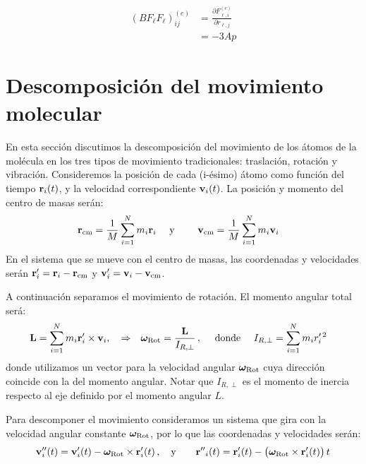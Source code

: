 \begin{align}
  (BF_{\ell}F_{\ell})^{(e)}_{ij} &= \frac{\partial F^{(e)}_{\ell,i}}{\partial r_{\ell,j}} \\&= -3 A p 
\end{align}

\newpage
\section{Descomposici\'{o}n del movimiento molecular}
\label{S:desc-movim-molec}

En esta secci\'{o}n discutimos la descomposici\'{o}n del movimiento de los \'{a}tomos de la mol\'{e}cula en los tres tipos de movimiento tradicionales: traslaci\'{o}n, rotaci\'{o}n y vibraci\'{o}n. Consideremos la posici\'{o}n de cada (i-\'{e}simo) \'{a}tomo como funci\'{o}n del tiempo $\mathbf{r}_{i}(t)$, y la velocidad correspondiente $\mathbf{v}_{i}(t)$. 
La posici\'{o}n y momento del centro de masas ser\'{a}n:
\begin{align*}
  \mathbf{r}_{\text{cm}}&= \frac{1}{M} \sum_{i=1}^{N} m_{i} \mathbf{r}_{i}  \quad \text{ y } \quad & \mathbf{v}_{\text{cm}}&= \frac{1}{M} \sum_{i=1}^{N} m_{i} \mathbf{v}_{i}
\end{align*}
%
En el sistema que se mueve con el centro de masas, las coordenadas y velocidades ser\'{a}n $\mathbf{r}'_{i}= \mathbf{r}_{i} - \mathbf{r}_{\text{cm}}$ y $\mathbf{v}'_{i}= \mathbf{v}_{i} - \mathbf{v}_{\text{cm}}$.

A continuaci\'{o}n separamos el movimiento de rotaci\'{o}n. El momento angular total ser\'{a}:
\begin{align*}
  \mathbf{L}&= \sum_{i=1}^{N} m_{i} \mathbf{r}'_{i} \times \mathbf{v}_{i},  \quad\Rightarrow & {\boldsymbol{\omega}}_{\text{Rot}}= \frac{\mathbf{L}}{I_{R,\perp}} \,, \quad \text{ donde } \quad & I_{R,\perp} = \sum_{i=1}^{N} m_{i} r^{\prime\,2}_{i}
\end{align*}
donde utilizamos un vector para la velocidad angular $\boldsymbol{\omega}_{\text{Rot}}$ cuya direcci\'{o}n coincide con la del momento angular. Notar que $I_{R, \perp}$ es el momento de inercia respecto al eje definido por el momento angular $L$.

Para descomponer el movimiento consideramos un sistema que gira con la velocidad angular constante $\boldsymbol{\omega}_{\text{Rot}}$, por lo que las coordenadas y velocidades ser\'{a}n:
\begin{align*}
\mathbf{v}_{i}''(t) &= \mathbf{v}_{i}'(t) -  \boldsymbol{\omega}_{\text{Rot}} \times \mathbf{r}'_{i}(t)\,, \quad \text{y} \quad
&  \mathbf{r''}_{i}(t) = \mathbf{r}_{i}'(t) - \bigl(\boldsymbol{\omega}_{\text{Rot}} \times \mathbf{r}'_{i}(t)\bigr) \, t
\end{align*}

